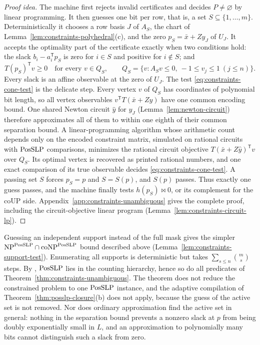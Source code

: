 \begin{proof}[Proof idea]
The machine first rejects invalid certificates and decides $P\ne\varnothing$
by linear programming. It then guesses one bit per row, that is, a set
$S\subseteq\{1,\ldots,m\}$. Deterministically it chooses a row basis $J$ of
$A_S$, the chart of Lemma~\ref{lem:constraints-polyhedral}(c), and the zero
$p_S=\bar x+Zy_J$ of $U_J$. It accepts the optimality part of the certificate
exactly when two conditions hold: the slack $b_i-a_i^{\mathsf T}p_S$ is zero
for $i\in S$ and positive for $i\notin S$; and
\begin{equation}\label{eq:constraints-cone-test}
 T(p_S)^{\mathsf T}v\ge0\quad\text{for every }v\in Q_S,
 \qquad Q_S=\{v:A_Sv\le0,\ -1\le v_j\le1\ (j\le n)\}.
\end{equation}
Every slack is an affine observable at the zero of $U_J$. The test
\eqref{eq:constraints-cone-test} is the delicate step. Every vertex $v$ of
$Q_S$ has coordinates of polynomial bit length, so all vertex observables
$v^{\mathsf T}T(\bar x+Zy)$ have one common encoding bound. One shared Newton
circuit $\hat y$ for $y_J$ (Lemma~\ref{lem:newton-circuit}) therefore
approximates all of them to within one eighth of their common separation
bound. A linear-programming algorithm whose arithmetic count depends only on
the encoded constraint matrix, simulated on
rational circuits with $\mathrm{PosSLP}$ comparisons, minimizes the rational circuit
objective $T(\bar x+Z\hat y)^{\mathsf T}v$ over $Q_S$. Its optimal vertex is
recovered as printed rational numbers, and one exact comparison of its true
observable decides \eqref{eq:constraints-cone-test}. A passing set $S$ forces
$p_S=p$ and $S=S(p)$, and $S(p)$ passes. Thus exactly one guess passes, and
the machine finally tests $h(p_S)\bowtie0$, or its complement for the
$\mathrm{coUP}$ side. Appendix~\ref{app:constraints-unambiguous} gives the
complete proof, including the circuit-objective linear program
(Lemma~\ref{lem:constraints-circuit-lp}).
\end{proof}

\begin{remark}
\label{rem:constraints-unambiguous}
Guessing an independent support instead of the full mask gives the simpler
$\mathrm{NP}^{\mathrm{PosSLP}}\cap\mathrm{coNP}^{\mathrm{PosSLP}}$ bound described above
(Lemma~\ref{lem:constraints-support-test}). Enumerating all supports is
deterministic but takes $\sum_{s\le n}\binom ms$ steps. By
\citet{AllenderEtAl2009}, $\mathrm{PosSLP}$ lies in the counting hierarchy, hence so do
all predicates of Theorem~\ref{thm:constraints-unambiguous}. The theorem does
not reduce the constrained problem to one $\mathrm{PosSLP}$ instance, and the adaptive
compilation of Theorem~\ref{thm:posslp-closure}(b) does not apply, because the
guess of the active set is not removed. Nor does ordinary approximation
find the active set in general: nothing in the separation bound prevents a
nonzero slack at $p$ from being doubly exponentially small in $L$, and an
approximation to polynomially many bits cannot distinguish such a slack from
zero.
\end{remark}


